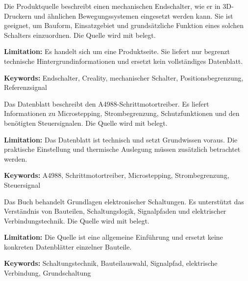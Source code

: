 %
%
%
%


{ 
	Die Produktquelle beschreibt einen mechanischen Endschalter, wie er in 3D-Druckern und ähnlichen Bewegungssystemen eingesetzt werden kann. Sie ist geeignet, um Bauform, Einsatzgebiet und grundsätzliche Funktion eines solchen Schalters einzuordnen. Die Quelle wird mit \cite{3DJAKE:2026} belegt.
	
	\bigskip
	
	\textbf{Limitation:} Es handelt sich um eine Produktseite. Sie liefert nur begrenzt technische Hintergrundinformationen und ersetzt kein vollständiges Datenblatt.
	
	\scriptsize{\textbf{Keywords:} Endschalter, Creality, mechanischer Schalter, Positionsbegrenzung, Referenzsignal}
}



{ 
	Das Datenblatt beschreibt den A4988-Schrittmotortreiber. Es liefert Informationen zu Microstepping, Strombegrenzung, Schutzfunktionen und den benötigten Steuersignalen. Die Quelle wird mit \cite{Allegro:A4988} belegt.
	
	\bigskip
	
	\textbf{Limitation:} Das Datenblatt ist technisch und setzt Grundwissen voraus. Die praktische Einstellung und thermische Auslegung müssen zusätzlich betrachtet werden.
	
	\scriptsize{\textbf{Keywords:} A4988, Schrittmotortreiber, Microstepping, Strombegrenzung, Steuersignal}
}



{ 
	Das Buch behandelt Grundlagen elektronischer Schaltungen. Es unterstützt das Verständnis von Bauteilen, Schaltungslogik, Signalpfaden und elektrischer Verbindungstechnik. Die Quelle wird mit \cite{Alles:2024} belegt.
	
	\bigskip
	
	\textbf{Limitation:} Die Quelle ist eine allgemeine Einführung und ersetzt keine konkreten Datenblätter einzelner Bauteile.
	
	\scriptsize{\textbf{Keywords:} Schaltungstechnik, Bauteilauswahl, Signalpfad, elektrische Verbindung, Grundschaltung}
}



